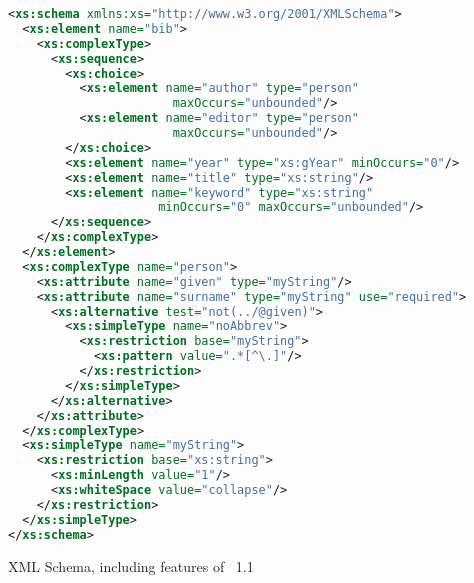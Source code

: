 \begin{example}
\begin{lstlisting}[language=XML]
<xs:schema xmlns:xs="http://www.w3.org/2001/XMLSchema">
  <xs:element name="bib">
    <xs:complexType>
      <xs:sequence>
        <xs:choice>
          <xs:element name="author" type="person" 
                       maxOccurs="unbounded"/>
          <xs:element name="editor" type="person" 
                       maxOccurs="unbounded"/>
        </xs:choice>
        <xs:element name="year" type="xs:gYear" minOccurs="0"/>
        <xs:element name="title" type="xs:string"/>
        <xs:element name="keyword" type="xs:string" 
                     minOccurs="0" maxOccurs="unbounded"/>
      </xs:sequence>
    </xs:complexType>
  </xs:element>
  <xs:complexType name="person">
    <xs:attribute name="given" type="myString"/>
    <xs:attribute name="surname" type="myString" use="required">
      <xs:alternative test="not(../@given)">
        <xs:simpleType name="noAbbrev">
          <xs:restriction base="myString">
            <xs:pattern value=".*[^\.]"/>
          </xs:restriction>
        </xs:simpleType>
      </xs:alternative>
    </xs:attribute>
  </xs:complexType>
  <xs:simpleType name="myString">
    <xs:restriction base="xs:string">
      <xs:minLength value="1"/>
      <xs:whiteSpace value="collapse"/>
    </xs:restriction>
  </xs:simpleType>
</xs:schema>
\end{lstlisting}
\caption{XML Schema, including features of ~1.1}
\label{ex:xsd}
\end{example}

